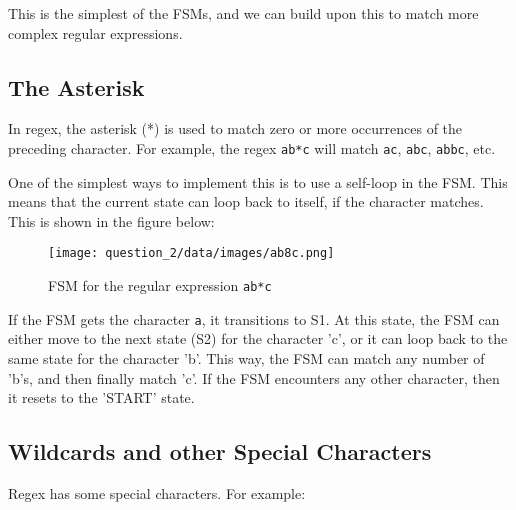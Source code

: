 \documentclass[12pt]{report}
\begin{document}
This is the simplest of the FSMs, and we can build upon this to match more complex regular expressions.

\subsection{The Asterisk}

In regex, the asterisk (*) is used to match zero or more occurrences of the preceding character. For example, the regex \texttt{ab*c} will match \texttt{ac}, \texttt{abc}, \texttt{abbc}, etc.

One of the simplest ways to implement this is to use a self-loop in the FSM. This means that the current state can loop back to itself, if the character matches. This is shown in the figure below:

\begin{figure}[H]
    \centering
    \texttt{[image: question\_2/data/images/ab8c.png]}
    \caption{FSM for the regular expression \texttt{ab*c}}
\end{figure}

If the FSM gets the character \texttt{a}, it transitions to S1. At this state, the FSM can either move to the next state (S2) for the character 'c', or it can loop back to the same state for the character 'b'. This way, the FSM can match any number of 'b's, and then finally match 'c'. If the FSM encounters any other character, then it resets to the 'START' state.

\subsection{Wildcards and other Special Characters}

Regex has some special characters. For example:
\end{document}
